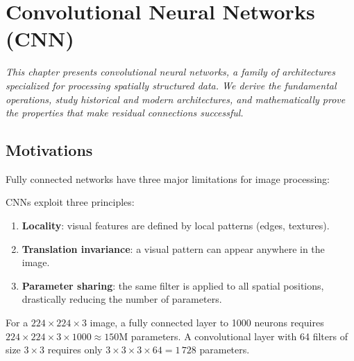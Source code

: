 \chapter{Convolutional Neural Networks (CNN)}
\label{ch:cnn}

\noindent\textit{This chapter presents convolutional neural networks, a family of
architectures specialized for processing spatially structured data.
We derive the fundamental operations, study historical and modern
architectures, and mathematically prove the properties that make
residual connections successful.}\medskip

\section{Motivations}
\label{sec:cnn-motivations}

Fully connected networks have three major limitations for image
processing:

\begin{definition}
CNNs exploit three principles:
\begin{enumerate}
  \item \textbf{Locality}: visual features are defined by local patterns
    (edges, textures).
  \item \textbf{Translation invariance}: a visual pattern can appear
    anywhere in the image.
  \item \textbf{Parameter sharing}: the same filter is applied to all
    spatial positions, drastically reducing the number of parameters.
\end{enumerate}
\end{definition}

\begin{remark}
For a $224 \times 224 \times 3$ image, a fully connected layer to 1000
neurons requires $224 \times 224 \times 3 \times 1000 \approx 150$M
parameters. A convolutional layer with 64 filters of size $3 \times 3$
requires only $3 \times 3 \times 3 \times 64 = 1\,728$ parameters.
\end{remark}

